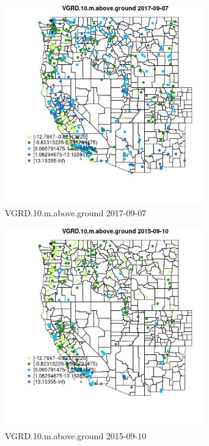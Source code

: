 \begin{figure} 
\centering  
\includegraphics[width=0.77\textwidth]{Code_Outputs/Report_ML_input_PM25_Step4_part_e_de_duplicated_aves_compiled_2019-05-20wNAs_MapObsVGRD10maboveground2017-09-07.jpg} 
\caption{\label{fig:Report_ML_input_PM25_Step4_part_e_de_duplicated_aves_compiled_2019-05-20wNAsMapObsVGRD10maboveground2017-09-07}VGRD.10.m.above.ground 2017-09-07} 
\end{figure} 
 

\begin{figure} 
\centering  
\includegraphics[width=0.77\textwidth]{Code_Outputs/Report_ML_input_PM25_Step4_part_e_de_duplicated_aves_compiled_2019-05-20wNAs_MapObsVGRD10maboveground2015-09-10.jpg} 
\caption{\label{fig:Report_ML_input_PM25_Step4_part_e_de_duplicated_aves_compiled_2019-05-20wNAsMapObsVGRD10maboveground2015-09-10}VGRD.10.m.above.ground 2015-09-10} 
\end{figure} 
 

